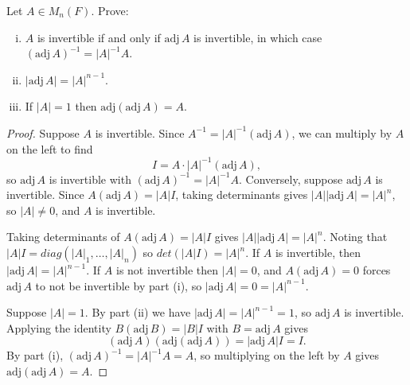 \begin{tcolorbox}[title=Problem 5, breakable]
Let $A \in M_n(F)$. Prove:
\begin{enumerate}[(i)]
    \item $A$ is invertible if and only if $\text{adj}\, A$ is invertible, in which case $(\text{adj}\, A)^{-1} = |A|^{-1}A$.
    \item $|\text{adj}\, A| = |A|^{n-1}$.
    \item If $|A| = 1$ then $\text{adj}(\text{adj}\, A) = A$.
\end{enumerate}
\end{tcolorbox}

\begin{proof}
    Suppose $A$ is invertible.
    Since $A^{-1} = |A|^{-1}(\text{adj}\, A)$, we can multiply by $A$ on the left to find
    \[I = A \cdot |A|^{-1}(\text{adj}\, A),\]
    so $\text{adj}\, A$ is invertible with $(\text{adj}\, A)^{-1} = |A|^{-1}A$.
    Conversely, suppose $\text{adj}\, A$ is invertible.
    Since $A(\text{adj}\, A) = |A|I$, taking determinants gives $|A||\text{adj}\, A| = |A|^n$, so $|A| \neq 0$, and $A$ is invertible.

    Taking determinants of $A(\text{adj}\, A) = |A|I$ gives $|A||\text{adj}\, A| = |A|^n$.
    Noting that $|A|I = diag(|A|_1, \ldots, |A|_n)$ so $det(|A|I) = |A|^n$.
    If $A$ is invertible, then $|\text{adj}\, A| = |A|^{n-1}$.
    If $A$ is not invertible then $|A| = 0$, and $A(\text{adj}\, A) = 0$ forces $\text{adj}\, A$ 
    to not be invertible by part (i), so $|\text{adj}\, A| = 0 = |A|^{n-1}$.

    Suppose $|A| = 1$.
    By part (ii) we have $|\text{adj}\, A| = |A|^{n-1} = 1$, so $\text{adj}\, A$ is invertible.
    Applying the identity $B(\text{adj}\, B) = |B|I$ with $B = \text{adj}\, A$ gives
    \[(\text{adj}\, A)(\text{adj}(\text{adj}\, A)) = |\text{adj}\, A| I = I.\]
    By part (i), $(\text{adj}\, A)^{-1} = |A|^{-1}A = A$, so multiplying on the left by $A$ gives $\text{adj}(\text{adj}\, A) = A$.
\end{proof}


